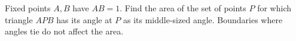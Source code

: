 Fixed points $A,B$ have $AB=1$. Find the area of the set of points $P$ for which triangle $APB$ has its angle at $P$ as its middle-sized angle. Boundaries where angles tie do not affect the area.
